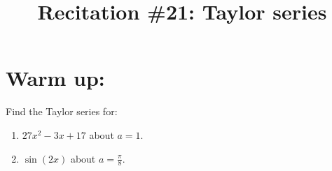 \documentclass[handout]{ximera}
\title{Recitation \#21: Taylor series}
\begin{document}
\begin{abstract}		\end{abstract}
\maketitle



\section{Warm up:}
Find the Taylor series for:  
	\begin{enumerate}
	\item  $27x^2 - 3x + 17$ about $a=1$.  
	\item  $\sin(2x)$ about $a = \frac{\pi}{8}$.  
	\end{enumerate}
	
\end{document}
